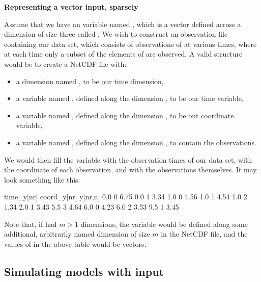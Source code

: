 \begin{example}
\noindent \textbf{Representing a vector input, sparsely}

Assume that we have an  variable named , which is a vector
defined across a dimension of size three called . We wish to construct
an observation file containing our data set, which consists of observations of
 at various times, where at each time only a subset of the elements of
 are observed. A valid structure would be to create a NetCDF file
with:
\begin{itemize}
\item a dimension named , to be our time dimension,
\item a variable named , defined along the dimension ,
  to be our time variable,
\item a variable named , defined along the dimension ,
  to be out coordinate variable,
\item a variable named , defined along the dimension , to
  contain the observations.
\end{itemize}
We would then fill the variable  with the observation times of
our data set,  with the coordinate of each observation, and
 with the observations themselves. It may look something like this:

\begin{cmdcode}
time_y[nr]    coord_y[nr]    y[nr,n]
       0.0             0       6.75
       0.0             1       3.34
       1.0             0       4.56
       1.0             1       4.54
       1.0             2       1.34
       2.0             1       3.43
       5.5             3       4.64
       6.0             0       4.23
       6.0             2       3.53
       9.5             1       3.45
\end{cmdcode}

Note that, if  had $m > 1$ dimensions, the 
variable would be defined along some additional, arbitrarily named dimension
of size $m$ in the NetCDF file, and the values of  in the above
table would be vectors.
\end{example}

\subsection{Simulating models with input\label{Simulating_models_with_input}}

